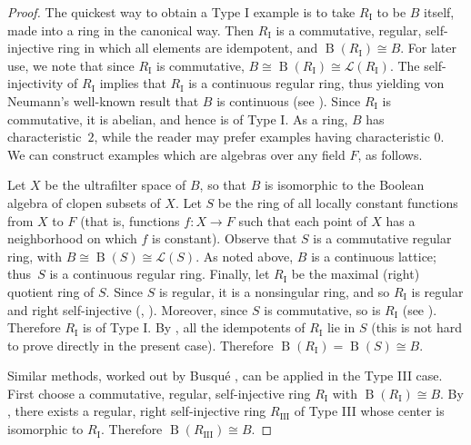 \documentclass[psamsfonts,reqno]{memo-l}
\theoremstyle{plain}
\theoremstyle{definition}
\theoremstyle{remark}
\numberwithin{equation}{section}
\DeclareMathOperator{\rB}{B}
\newcommand{\I}{\mathrm{I}}
\newcommand{\III}{\mathrm{III}}
\newcommand{\Lat}{\mathcal{L}}
\begin{document}
\begin{proof}
The quickest way to obtain a Type I example is to
take $R_{\I}$ to be $B$ itself, made into a ring in the canonical
way. Then $R_{\I}$ is a commutative, regular, self-injective ring
%
in which all elements are idempotent, and $\rB(R_{\I})\cong B$. For
later use, we note that since $R_{\I}$ is commutative, $B\cong
\rB(R_{\I})\cong \Lat(R_{\I})$. The self-injectivity of $R_{\I}$
implies that $R_{\I}$ is a continuous regular ring,
thus yielding von Neumann's well-known result that $B$ is continuous (see
\cite[Lemma~II.4.10]{GLT2}).
Since $R_{\I}$ is commutative, it is abelian, and hence
is of Type I. As a ring, $B$ has characteristic~$2$, while the
reader may prefer examples having characteristic 0. We can construct
examples which are algebras over any field $F$, as follows.

Let $X$ be the ultrafilter space of $B$, so that $B$ is isomorphic
to the Boolean algebra 
of clopen subsets of $X$. Let $S$ be the
ring of all locally constant functions from $X$ to $F$ (that is,
functions $f:X\rightarrow F$ such that each point of $X$ has a
neighborhood on which $f$ is constant). Observe that $S$ is a
commutative regular ring, with $B\cong \rB(S)\cong \Lat(S)$. As
noted above, $B$ is a continuous lattice;
 thus~$S$ is a
continuous regular ring.
Finally, let $R_{\I}$ be the maximal
(right) quotient ring of $S$. Since $S$ is regular, it is a
nonsingular ring, and so $R_{\I}$ is regular and right
self-injective (\cite[Corollary~2.31]{Gnonsing},
\cite[Theorem~13.36]{Lam}).
%
Moreover, since $S$ is commutative, so is
$R_{\I}$ (see \cite[Lemma~14.15]{Lam}). Therefore $R_{\I}$ is of Type I.
By \cite[Theorem~13.13]{GvnRR}, all the idempotents
of $R_{\I}$ lie in $S$ (this is not hard to prove directly in the present
case). Therefore
$\rB(R_{\I})= \rB(S)\cong B$.

Similar methods, worked out by Busqu\'e \cite{Busq93},
can be applied in the Type III case. First choose a commutative, regular,
self-injective ring $R_{\I}$
%
with $\rB(R_{\I})\cong B$. By
\cite[Theorem~2.5]{Busq93}, there exists a regular,
right self-injective ring $R_{\III}$
%
of Type III whose center is
isomorphic to $R_{\I}$. Therefore $\rB(R_{\III})\cong B$. \end{proof}
\end{document}
